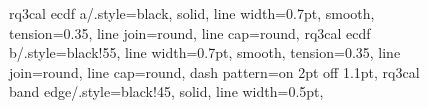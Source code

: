 \begin{figure}[t]
{    %
    rq3cal ecdf a/.style={black, solid, line width=0.7pt, smooth,
      tension=0.35, line join=round, line cap=round},
    rq3cal ecdf b/.style={black!55, line width=0.7pt, smooth,
      tension=0.35, line join=round, line cap=round,
      dash pattern=on 2pt off 1.1pt},
    rq3cal band edge/.style={black!45, solid, line width=0.5pt},
  }


\end{figure}
